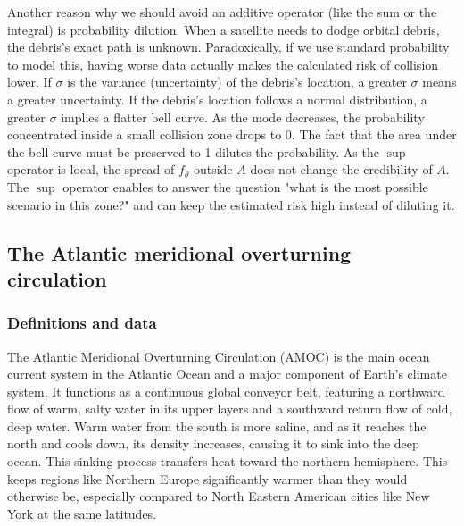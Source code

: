 \documentclass[12pt,a4paper]{article}
\theoremstyle{definition}
\theoremstyle{plain}
\begin{document}
\noindent Another reason why we should avoid an additive operator (like the sum or the integral) is probability dilution. When a satellite needs to dodge orbital debris, the debris's exact path is unknown. Paradoxically, if we use standard probability to model this, having worse data actually makes the calculated risk of collision lower. If $\sigma$ is the variance (uncertainty) of the debris's location, a greater $\sigma$ means a greater uncertainty. If the debris's location follows a normal distribution, a greater $\sigma$ implies a flatter bell curve. As the mode decreases, the probability concentrated inside a small collision zone drops to 0. The fact that the area under the bell curve must be preserved to 1 dilutes the probability. As the $\sup$ operator is local, the spread of $f_\theta$ outside $A$ does not change the credibility of $A$. The $\sup$ operator enables to answer the question "what is the most possible scenario in this zone?" and can keep the estimated risk high instead of diluting it. \\





\subsection{The Atlantic meridional overturning circulation}
\label{sec:amoc}

\subsubsection{Definitions and data}

\noindent The Atlantic Meridional Overturning Circulation (AMOC) \cite{ditlevsen2023} is the main ocean current system in the Atlantic Ocean and a major component of Earth's climate system. It functions as a continuous global conveyor belt, featuring a northward flow of warm, salty water in its upper layers and a southward return flow of cold, deep water. Warm water from the south is more saline, and as it reaches the north and cools down, its density increases, causing it to sink into the deep ocean. This sinking process transfers heat toward the northern hemisphere. This keeps regions like Northern Europe significantly warmer than they would otherwise be, especially compared to North Eastern American cities like New York at the same latitudes. \\
\end{document}
